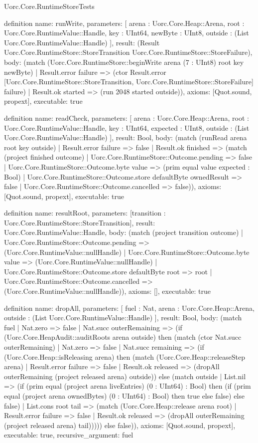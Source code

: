 \begin{lexlean}{Uorc.Core.RuntimeStoreTests}
\begin{semanticmodule}
definition{
  name: runWrite,
  parameters: [
    arena : Uorc.Core.Heap::Arena,
    root : Uorc.Core.RuntimeValue::Handle,
    key : UInt64,
    newByte : UInt8,
    outside : (List Uorc.Core.RuntimeValue::Handle)
  ],
  result: (Result Uorc.Core.RuntimeStore::StoreTransition Uorc.Core.RuntimeStore::StoreFailure),
  body: (match (Uorc.Core.RuntimeStore::beginWrite arena (7 : UInt8) root key newByte)
    | Result.error failure => (ctor Result.error [Uorc.Core.RuntimeStore::StoreTransition, Uorc.Core.RuntimeStore::StoreFailure] failure)
    | Result.ok started => (run 2048 started outside)),
  axioms: [Quot.sound, propext],
  executable: true
}

definition{
  name: readCheck,
  parameters: [
    arena : Uorc.Core.Heap::Arena,
    root : Uorc.Core.RuntimeValue::Handle,
    key : UInt64,
    expected : UInt8,
    outside : (List Uorc.Core.RuntimeValue::Handle)
  ],
  result: Bool,
  body: (match (runRead arena root key outside)
    | Result.error failure => false
    | Result.ok finished => (match (project finished outcome)
      | Uorc.Core.RuntimeStore::Outcome.pending => false
      | Uorc.Core.RuntimeStore::Outcome.byte value => (prim equal value expected : Bool)
      | Uorc.Core.RuntimeStore::Outcome.store defaultByte ownedResult => false
      | Uorc.Core.RuntimeStore::Outcome.cancelled => false)),
  axioms: [Quot.sound, propext],
  executable: true
}

definition{
  name: resultRoot,
  parameters: [transition : Uorc.Core.RuntimeStore::StoreTransition],
  result: Uorc.Core.RuntimeValue::Handle,
  body: (match (project transition outcome)
    | Uorc.Core.RuntimeStore::Outcome.pending => (Uorc.Core.RuntimeValue::nullHandle)
    | Uorc.Core.RuntimeStore::Outcome.byte value => (Uorc.Core.RuntimeValue::nullHandle)
    | Uorc.Core.RuntimeStore::Outcome.store defaultByte root => root
    | Uorc.Core.RuntimeStore::Outcome.cancelled => (Uorc.Core.RuntimeValue::nullHandle)),
  axioms: [],
  executable: true
}

definition{
  name: dropAll,
  parameters: [
    fuel : Nat,
    arena : Uorc.Core.Heap::Arena,
    outside : (List Uorc.Core.RuntimeValue::Handle)
  ],
  result: Bool,
  body: (match fuel
    | Nat.zero => false
    | Nat.succ outerRemaining => (if (Uorc.Core.HeapAudit::auditRoots arena outside) then (match (ctor Nat.succ outerRemaining)
      | Nat.zero => false
      | Nat.succ remaining => (if (Uorc.Core.Heap::isReleasing arena) then (match (Uorc.Core.Heap::releaseStep arena)
        | Result.error failure => false
        | Result.ok released => (dropAll outerRemaining (project released arena) outside)) else (match outside
        | List.nil => (if (prim equal (project arena liveEntries) (0 : UInt64) : Bool) then (if (prim equal (project arena ownedBytes) (0 : UInt64) : Bool) then true else false) else false)
        | List.cons root tail => (match (Uorc.Core.Heap::release arena root)
          | Result.error failure => false
          | Result.ok released => (dropAll outerRemaining (project released arena) tail))))) else false)),
  axioms: [Quot.sound, propext],
  executable: true,
  recursive_argument: fuel
}


\end{semanticmodule}
\end{lexlean}

